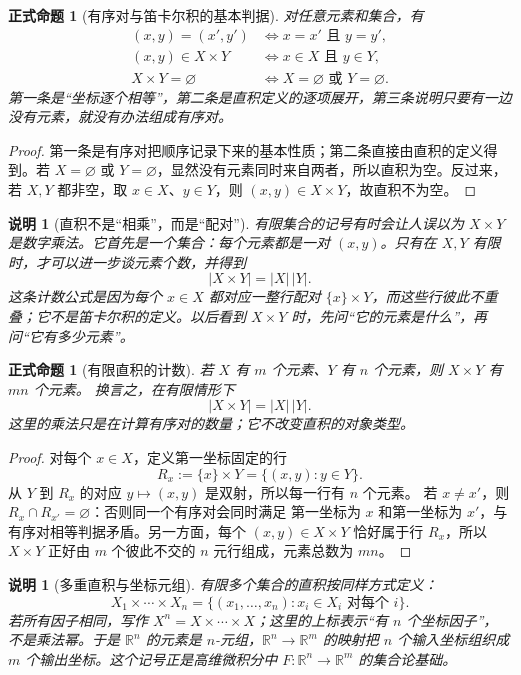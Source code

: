 \documentclass[UTF8,fontset=none,a4paper,11pt]{ctexart}
\theoremstyle{foundation-definition}
\theoremstyle{foundation-theorem}
\theoremstyle{foundation-proposition}
\newtheorem{proposition}[definition]{正式命题}
\theoremstyle{foundation-example}
\theoremstyle{foundation-remark}
\newtheorem{remark}[definition]{说明}
\theoremstyle{foundation-theorem}
\begin{document}
\begin{proposition}[有序对与笛卡尔积的基本判据]
对任意元素和集合，有
\[
\begin{aligned}
 (x,y)=(x',y')&\Longleftrightarrow x=x'\text{ 且 }y=y',\\
 (x,y)\in X\times Y&\Longleftrightarrow x\in X\text{ 且 }y\in Y,\\
 X\times Y=\varnothing&\Longleftrightarrow X=\varnothing\text{ 或 }Y=\varnothing.
\end{aligned}
\]
第一条是“坐标逐个相等”，第二条是直积定义的逐项展开，第三条说明只要有一边没有元素，就没有办法组成有序对。
\end{proposition}

\begin{proof}
第一条是有序对把顺序记录下来的基本性质；第二条直接由直积的定义得到。若 \(X=\varnothing\) 或 \(Y=\varnothing\)，显然没有元素同时来自两者，所以直积为空。反过来，若 \(X,Y\) 都非空，取 \(x\in X\)、\(y\in Y\)，则 \((x,y)\in X\times Y\)，故直积不为空。
\end{proof}

\begin{remark}[直积不是“相乘”，而是“配对”]
有限集合的记号有时会让人误以为 \(X\times Y\) 是数字乘法。它首先是一个集合：每个元素都是一对 \((x,y)\)。只有在 \(X,Y\) 有限时，才可以进一步谈元素个数，并得到
\[
|X\times Y|=|X|\,|Y|.
\]
这条计数公式是因为每个 \(x\in X\) 都对应一整行配对
\(\{x\}\times Y\)，而这些行彼此不重叠；它不是笛卡尔积的定义。以后看到 \(X\times Y\) 时，先问“它的元素是什么”，再问“它有多少元素”。
\end{remark}

\begin{proposition}[有限直积的计数]
若 $X$ 有 $m$ 个元素、$Y$ 有 $n$ 个元素，则 $X\times Y$ 有 $mn$ 个元素。
换言之，在有限情形下
\[
  |X\times Y|=|X|\,|Y|.
\]
这里的乘法只是在计算有序对的数量；它不改变直积的对象类型。
\end{proposition}

\begin{proof}
对每个 $x\in X$，定义第一坐标固定的行
\[
  R_x:=\{x\}\times Y=\{(x,y):y\in Y\}.
\]
从 $Y$ 到 $R_x$ 的对应 $y\mapsto(x,y)$ 是双射，所以每一行有 $n$ 个元素。
若 $x\ne x'$，则 $R_x\cap R_{x'}=\varnothing$：否则同一个有序对会同时满足
第一坐标为 $x$ 和第一坐标为 $x'$，与有序对相等判据矛盾。另一方面，每个
$(x,y)\in X\times Y$ 恰好属于行 $R_x$，所以 $X\times Y$ 正好由 $m$ 个彼此不交的
$n$ 元行组成，元素总数为 $mn$。
\end{proof}

\begin{remark}[多重直积与坐标元组]
有限多个集合的直积按同样方式定义：
\[
X_1\times\cdots\times X_n
=\{(x_1,\ldots,x_n):x_i\in X_i\text{ 对每个 }i\}.
\]
若所有因子相同，写作 \(X^n=X\times\cdots\times X\)；这里的上标表示“有 \(n\) 个坐标因子”，
不是乘法幂。于是 \(\mathbb R^n\) 的元素是 \(n\)-元组，\(\mathbb R^n\to\mathbb R^m\)
的映射把 \(n\) 个输入坐标组织成 \(m\) 个输出坐标。这个记号正是高维微积分中
\(F:\mathbb R^n\to\mathbb R^m\) 的集合论基础。
\end{remark}
\end{document}
